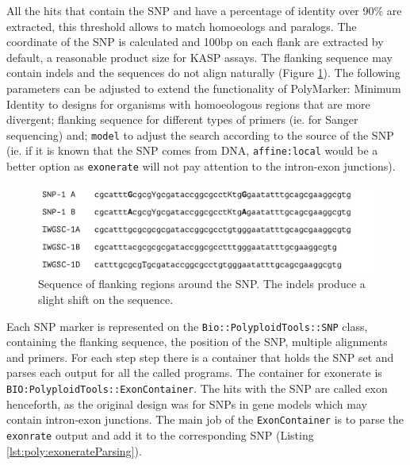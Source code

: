 All the hits that contain the SNP and have a percentage of identity over 90\% are extracted, this threshold allows to match homoeologs and paralogs. 
The coordinate of the SNP is calculated and 100bp on each flank are extracted by default, a reasonable product size for KASP assays. 
The flanking sequence may contain \acrshort{indels} and the sequences do not align naturally (Figure \ref{fig:poly:globalSequence}).
The following parameters can be adjusted to extend the functionality of PolyMarker: Minimum Identity to designs for organisms with homoeologous regions that are more divergent; flanking sequence for different types of primers (ie. for Sanger sequencing) and;  \verb|model| to adjust the search according to the source of the SNP (ie. if it is known that the SNP comes from DNA, \verb|affine:local| would be a better option as \verb|exonerate| will not pay attention to the intron-exon junctions).

\begin{figure}
\includegraphics[width=1\textwidth]{PolyMarker/Figures/aln/scaffoldsFound.pdf}
\caption[Sequence of flanking regions around the SNP.]{Sequence of flanking regions around the SNP. The \acrshort{indels} produce a slight shift on the sequence.}
\label{fig:poly:globalSequence}
\end{figure}


Each SNP marker is represented on the \verb|Bio::PolyploidTools::SNP| class, containing the flanking sequence, the position of the SNP, multiple alignments and primers. 
For each step step there is a container that holds the SNP set and parses each output for all the called programs. 
The container for exonerate is \verb|BIO:PolyploidTools::ExonContainer|. 
The hits with the SNP are called exon henceforth, as the original design was for SNPs in gene models which may contain intron-exon junctions. 
The main job of the \verb|ExonContainer| is to parse the \verb|exonrate| output and add it to the corresponding SNP (Listing \ref{lst:poly:exonerateParsing}). 

